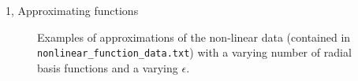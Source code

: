 \documentclass[10pt,a4paper]{article}
\begin{document}
\begin{task}{1, Approximating functions}
\begin{figure}[H]
    \hfill
    \caption{Examples of approximations of the non-linear data (contained in \texttt{nonlinear\_function\_data.txt}) with a varying number of radial basis functions and a varying $\epsilon$.}
    \label{fig:bases-eps}
\end{figure}

\end{task}
\end{document}
